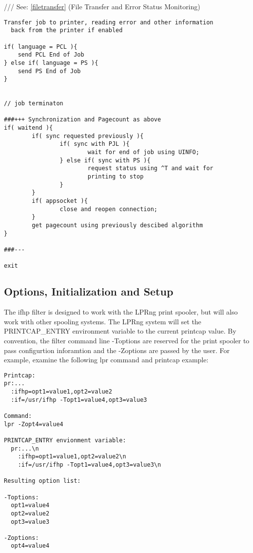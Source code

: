 \documentclass[a4paper]{article}
\begin{document}
{\ttfamily ///} See: \ref{filetransfer} {(File Transfer and Error Status Monitoring)}
\begin{tscreen}
\begin{verbatim}
Transfer job to printer, reading error and other information
  back from the printer if enabled

if( language = PCL ){
    send PCL End of Job
} else if( language = PS ){
    send PS End of Job
}


// job terminaton

###+++ Synchronization and Pagecount as above
if( waitend ){
        if( sync requested previously ){
                if( sync with PJL ){
                        wait for end of job using UINFO;
                } else if( sync with PS ){
                        request status using ^T and wait for
                        printing to stop
                }
        }
        if( appsocket ){
                close and reopen connection;
        }
        get pagecount using previously descibed algorithm
}
        
###---

exit
\end{verbatim}
\end{tscreen}



\subsection{Options, Initialization and Setup
\label{setup}}

The
{\ttfamily ifhp}
filter is designed to work with the LPRng print spooler,
but will also work with other spooling systems.
The LPRng system will set the 
{\ttfamily PRINTCAP\_ENTRY}
environment variable to the current printcap value.
By convention,
the filter command line
{\ttfamily -Toptions}
are reserved for the print spooler to pass configurtion inforamtion
and the
{\ttfamily -Zoptions}
are passed by the user.
For example,
examine the following
{\ttfamily lpr}
command and printcap example:
\begin{tscreen}
\begin{verbatim}
Printcap:
pr:...
  :ifhp=opt1=value1,opt2=value2
  :if=/usr/ifhp -Topt1=value4,opt3=value3

Command:
lpr -Zopt4=value4

PRINTCAP_ENTRY envionment variable: 
  pr:...\n
    :ifhp=opt1=value1,opt2=value2\n
    :if=/usr/ifhp -Topt1=value4,opt3=value3\n

Resulting option list:

-Toptions:
  opt1=value4
  opt2=value2
  opt3=value3

-Zoptions:
  opt4=value4
\end{verbatim}
\end{tscreen}
\end{document}
